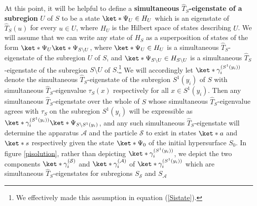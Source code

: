 \documentclass[12pt]{report}
\begin{document}
At this point, it will be helpful to define a \textbf{simultaneous $\hat{T}_S$-eigenstate of a subregion} $U$ of $S$ to be a state $\ket*{\Psi_U}\in H_U$  %
%
 which is an eigenstate of $\hat{T}_S(u)$ for every $u\in U$, where $H_U$ is the Hilbert space of states describing $U$. We will assume that we can write any state of $H_S$ as a superposition of states of the form $\ket*{\Psi_U}\ket*{\Psi_{S\setminus U}}$,%
  where $\ket*{\Psi_U}\in H_U $ is  a simultaneous $\hat{T}_S$-eigenstate of the subregion $U$ of $S$, and $\ket*{\Psi_{S\setminus U}}\in H_{S\setminus U}$ is a simultaneous
$\hat{T}_S$-eigenstate of the subregion $S\setminus U$ of $S$.\footnote{We effectively made this assumption in equation (\ref{Sistate}).} We will accordingly let  
$\ket*{\gamma^{(S^1(y_i))}_i}$ %
%
 denote the simultaneous $\hat{T}_S$-eigenstate of the subregion $S^1(y_i)$ of $S$ with simultaneous $\hat{T}_S$-eigenvalue $\tau_S(x)$ respectively for all $x\in S^1(y_i)$. Then any  simultaneous $\hat{T}_S$-eigenstate over the whole of $S$  whose simultaneous $\hat{T}_S$-eigenvalue agrees with 
$\tau_S$ on the subregion $S^1(y_i)$ will be expressible as
$\ket*{\gamma^{(S^1(y_i))}_i}\ket*{\Psi_{S\setminus S^1(y_i)}}$, 
and any such simultaneous $\hat{T}_S$-eigenstate will determine the apparatus $\mathcal{A}$ and the particle $\mathcal{S}$ to exist in states $\ket*{a}$ and $\ket*{s}$ respectively given the state $\ket*{\Psi_0}$ of the initial hypersurface $S_0$. In figure \ref{pisolution}, rather than depicting $\ket*{\gamma^{(S^1(y_i))}_i}$, we depict the two components $\ket*{\gamma^{(\mathcal{S})}_i}$ and $\ket*{\gamma^{(\mathcal{A})}_i}$ %
%
 of $\ket*{\gamma^{(S^1(y_i))}_i}$ %
 which are simultaneous $\hat{T}_S$-eigenstates for subregions $S_{\mathcal{S}}$ and $S_{\mathcal{A}}$ %
\end{document}

